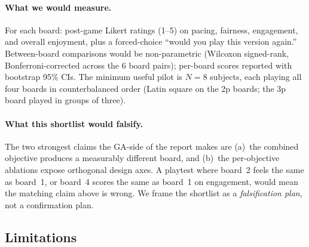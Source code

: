 \documentclass[10pt]{article}
\begin{document}
\paragraph{What we would measure.} For each board: post-game
Likert ratings (1--5) on pacing, fairness, engagement, and
overall enjoyment, plus a forced-choice ``would you play this
version again.'' Between-board comparisons would be
non-parametric (Wilcoxon signed-rank, Bonferroni-corrected
across the 6 board pairs); per-board scores reported with
bootstrap 95\% CIs. The minimum useful pilot is $N{=}8$
subjects, each playing all four boards in counterbalanced order
(Latin square on the 2p boards; the 3p board played in groups
of three).

\paragraph{What this shortlist would falsify.} The two strongest
claims the GA-side of the report makes are (a)~the combined
objective produces a measurably different board, and (b)~the
per-objective ablations expose orthogonal design axes. A
playtest where board~2 feels the same as board~1, or board~4
scores the same as board~1 on engagement, would mean the
matching claim above is wrong. We frame the shortlist as a
\emph{falsification plan}, not a confirmation plan.

\subsection{Limitations}\label{app:limitations}
\end{document}
